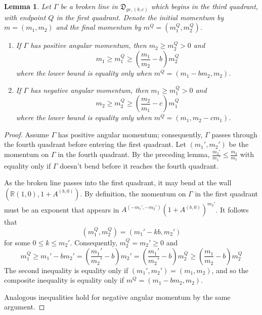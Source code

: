 \documentclass[11pt]{amsart}
\newtheorem{lemma}{Lemma}[section]
\theoremstyle{remark}
\numberwithin{equation}{section}
\begin{document}
\begin{lemma}
Let $\Gamma$ be a broken line in $\mathfrak{D}_{gr,(b,c)}$ which begins in the third quadrant, with endpoint $Q$ in the first quadrant.  Denote the  initial momentum by $m=(m_1,m_2)$ and the final momentum by $m^Q=(m_1^Q,m_2^Q)$.  
\begin{enumerate}
	\item If $\Gamma$ has positive angular momentum, then $m_2\geq m_2^Q>0$ and
	\[ m_1\geq m_1^Q\geq\left( \frac{m_1}{m_2}-b\right)m_2^Q\]
	where the lower bound is equality only when $m^Q =( m_1-bm_2,m_2)$.
	\item If $\Gamma$ has negative angular momentum, then $m_1\geq  m_1^Q>0$ and
	\[ m_2 \geq m_2^Q\geq\left( \frac{m_2}{m_1}-c\right)m_1^Q\]
	where the lower bound is equality only when $m^Q =( m_1,m_2-cm_1)$.
\end{enumerate}
\end{lemma}
\begin{proof}
Assume $\Gamma$ has positive angular momentum; consequently, $\Gamma$ passes through the fourth quadrant before entering the first quadrant.  Let $(m_1',m_2')$ be the momentum on $\Gamma$ in the fourth quadrant.  By the preceding lemma, $\frac{m_2'}{m_1'}\leq \frac{m_2}{m_1}$ with equality only if $\Gamma$ doesn't bend before it reaches the fourth quadrant.  

As the broken line passes into the first quadrant, it may bend at the wall $(\mathbb{R}(1,0),1+A^{(b,0)})$.  By definition, the momentum on $\Gamma$ in the first quadrant must be an exponent that appears in $A^{(-m_1',-m_2')}(1+A^{(b,0)})^{m_2'}$.  It follows that%
\[ (m_1^Q,m_2^Q) = (m_1'-kb,m_2')\]
for some $0\leq k\leq m_2'$.
Consequently, $m_2^Q=m_2'\geq0$ and 
\[ m_1^Q\geq m_1' - bm_2' = \left(\frac{m_1'}{m_2'} - b\right) m_2'  = \left(\frac{m_1'}{m_2'} - b\right) m_2^Q \geq \left(\frac{m_1}{m_2} - b\right) m_2^Q\]
The second inequality is equality only if $(m_1',m_2')=(m_1,m_2)$, and so the composite inequality is equality only if $m^Q =( m_1-bm_2,m_2)$.

Analogous inequalities hold for negative angular momentum by the same argument.
\end{proof}
\end{document}
